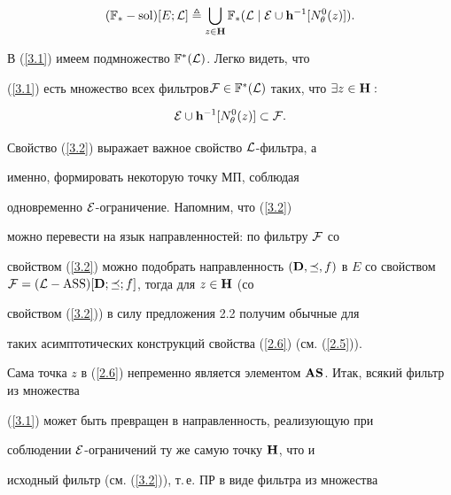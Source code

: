 {\begin{equation} \label{3.1} 


({{\Bbb F}_*}-\sol)[E;{\cal


L}] \triangleq \bigcup\limits_{z \in {\bold H}}{{\Bbb F}_*}({\cal


L}\mid{\cal E}\cup{{\bold h}^{-1}}[{N_\theta^0}(z)]).


\end{equation}


В (\ref{3.1}) имеем подмножество ${{\Bbb F}^*}({\cal L})$. Легко видеть, что


(\ref{3.1}) есть множество всех фильтров\linebreak ${\cal F} \in {{\Bbb


F}^*}({\cal L})$ таких, что $\exi{z} \in {\bold H}:$


\begin{equation} \label{3.2}


{\cal E}\cup{{\bold h}^{-1}}[{N_\theta^0}(z)] \subset {\cal F}.


\end{equation}


Свойство (\ref{3.2}) выражает важное свойство ${\cal L}$-фильтра, а


именно, формировать некоторую точку МП, соблюдая


одновременно ${\cal E}$-ограничение. Напомним, что (\ref{3.2})


можно перевести на язык направленностей: по фильтру ${\cal F}$ со


свойством (\ref{3.2}) можно подобрать направленность $({\bold


D},\preceq,f)$ в $E$ со свойством ${\cal F} = ({\cal


L}-\ASS)[{\bold D};\preceq;f]$, тогда для $z \in {\bold H}$ (со


свойством (\ref{3.2})) в силу предложения 2.2 получим обычные для


таких асимптотических конструкций свойства (\ref{2.6}) (см. (\ref{2.5})).


Сама точка $z$ в (\ref{2.6}) непременно является элементом ${\bold


A}{\bold S}$. Итак, всякий фильтр из множества


(\ref{3.1}) может быть превращен в направленность, реализующую при


соблюдении ${\cal E}$-ограничений ту же самую точку ${\bold H}$, что и


исходный фильтр (см. (\ref{3.2})), т.\,е. ПР в виде фильтра из множества


}
